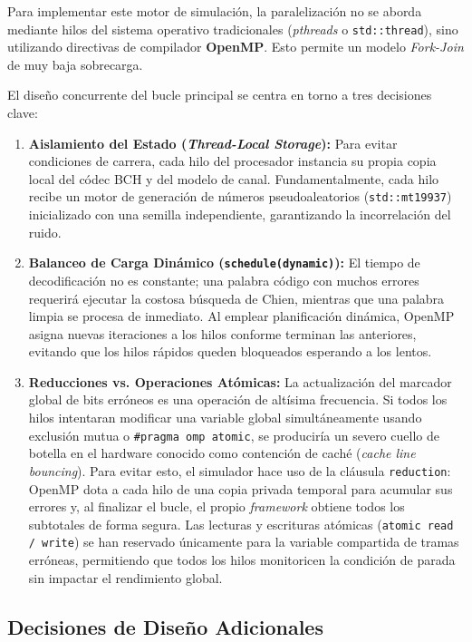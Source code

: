 Para implementar este motor de simulación, la paralelización no se aborda mediante hilos del sistema operativo tradicionales (\textit{pthreads} o \texttt{std::thread}), sino utilizando directivas de compilador \textbf{OpenMP}. Esto permite un modelo \textit{Fork-Join} de muy baja sobrecarga.

El diseño concurrente del bucle principal se centra en torno a tres decisiones clave:

\begin{enumerate}
    \item \textbf{Aislamiento del Estado (\textit{Thread-Local Storage}):} 
    Para evitar condiciones de carrera, cada hilo del procesador instancia su propia copia local del códec BCH y del modelo de canal. Fundamentalmente, cada hilo recibe un motor de generación de números pseudoaleatorios (\texttt{std::mt19937}) inicializado con una semilla independiente, garantizando la incorrelación del ruido.

    \item \textbf{Balanceo de Carga Dinámico (\texttt{schedule(dynamic)}):} 
    El tiempo de decodificación no es constante; una palabra código con muchos errores requerirá ejecutar la costosa búsqueda de Chien, mientras que una palabra limpia se procesa de inmediato. Al emplear planificación dinámica, OpenMP asigna nuevas iteraciones a los hilos conforme terminan las anteriores, evitando que los hilos rápidos queden bloqueados esperando a los lentos.

    \item \textbf{Reducciones vs. Operaciones Atómicas:} 
    La actualización del marcador global de bits erróneos es una operación de altísima frecuencia. Si todos los hilos intentaran modificar una variable global simultáneamente usando exclusión mutua o \texttt{\#pragma omp atomic}, se produciría un severo cuello de botella en el hardware conocido como contención de caché (\textit{cache line bouncing}). Para evitar esto, el simulador hace uso de la cláusula \texttt{reduction}: OpenMP dota a cada hilo de una copia privada temporal para acumular sus errores y, al finalizar el bucle, el propio \textit{framework} obtiene todos los subtotales de forma segura. 
    Las lecturas y escrituras atómicas (\texttt{atomic read / write}) se han reservado únicamente para la variable compartida de tramas erróneas, permitiendo que todos los hilos monitoricen la condición de parada sin impactar el rendimiento global.
\end{enumerate}

\subsection{Decisiones de Diseño Adicionales}

